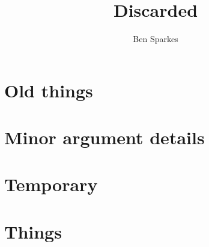 \documentclass[10pt]{report}
\title{
  Discarded
  }
\author{Ben Sparkes}
\begin{document}

\maketitle

\tableofcontents

\newpage


\part{Old things}











\part{Minor argument details}

\part{Temporary}



\printbibliography

\part{Things}


\end{document}
